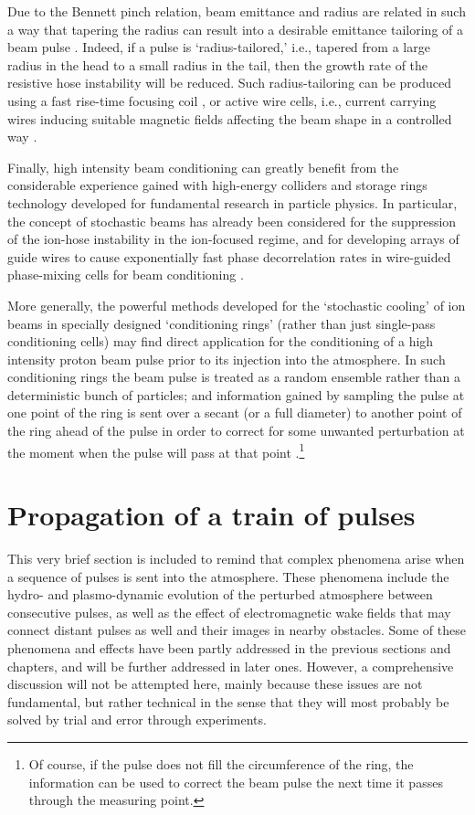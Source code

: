 \documentclass [12pt,a4paper,     ]{report} %
\begin{document}
   Due to the Bennett pinch relation, beam emittance and radius are related in such a way that tapering the radius can result into a desirable emittance tailoring of a beam pulse \cite{WEIDM1994-}. Indeed, if a pulse is `radius-tailored,' i.e., tapered from a large radius in the head to a small radius in the tail, then the growth rate of the resistive hose instability will be reduced. Such radius-tailoring can be produced using a fast rise-time focusing coil \cite{WEIDM1994-}, or active wire cells, i.e., current carrying wires inducing suitable magnetic fields affecting the beam shape in a controlled way \cite{MURPH1996-, ROSE-2001B}.


  Finally, high intensity beam conditioning can greatly benefit from the considerable experience gained with high-energy colliders and storage rings technology developed for fundamental research in particle physics.  In particular, the concept of stochastic beams has already been considered for the suppression of the ion-hose instability in the ion-focused regime, and for developing arrays of guide wires to cause exponentially fast phase decorrelation rates in wire-guided phase-mixing cells for beam conditioning \cite{OBRIE1990B}.

   More generally, the powerful methods developed for the `stochastic cooling' of ion beams in specially designed `conditioning rings' (rather than just single-pass conditioning cells) may find direct application for the conditioning of a high intensity proton beam pulse prior to its injection into the atmosphere. In such conditioning rings the beam pulse is treated as a random ensemble rather than a deterministic bunch of particles; and information gained by sampling the pulse at one point of the ring is sent over a secant (or a full diameter) to another point of the ring ahead of the pulse in order to correct for some unwanted perturbation at the moment when the pulse will pass at that point \cite{-MEER1980-}.\footnote{Of course, if the pulse does not fill the circumference of the ring, the information can be used to correct the beam pulse the next time it passes through the measuring point.}


\section{Propagation of a train of pulses}
\label{mul:0}

  This very brief section is included to remind that complex phenomena arise when a sequence of pulses is sent into the atmosphere.  These phenomena include the hydro- and plasmo-dynamic evolution of the perturbed atmosphere between  consecutive pulses, as well as the effect of electromagnetic wake fields that may connect distant pulses as well and their images in nearby obstacles.  Some of these phenomena and effects have been partly addressed in the previous sections and chapters, and will be further addressed in later ones.  However, a comprehensive discussion will not be attempted here, mainly because these issues are not fundamental, but rather technical in the sense that they will most probably be solved by trial and error through experiments. 
\end{document}
